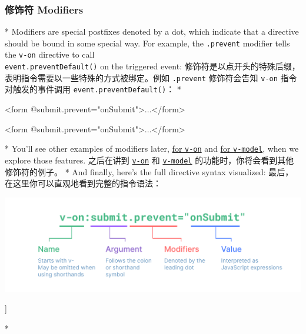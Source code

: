 \begin{paracol}{2}
\subsubsection{修饰符 Modifiers}
\switchcolumn[0]*%
Modifiers are special postfixes denoted by a dot, which indicate that a
directive should be bound in some special way. For example, the
\texttt{.prevent} modifier tells the \texttt{v-on} directive to call
\\\texttt{event.preventDefault()} on the triggered event:
\switchcolumn
修饰符是以点开头的特殊后缀，表明指令需要以一些特殊的方式被绑定。例如
\texttt{.prevent} 修饰符会告知 \texttt{v-on} 指令对触发的事件调用
\texttt{event.preventDefault()}：
\switchcolumn[0]*%
\begin{codeHtml}
<form @submit.prevent="onSubmit">...</form>
\end{codeHtml}  
\switchcolumn
\begin{codeHtml}
<form @submit.prevent="onSubmit">...</form>
\end{codeHtml}  
\switchcolumn[0]*%
You'll see other examples of modifiers later,
\href{https://vuejs.org/guide/essentials/event-handling.html\#event-modifiers}{for
\texttt{v-on}} and
\href{https://vuejs.org/guide/essentials/forms.html\#modifiers}{for
\texttt{v-model}}, when we explore those features.
\switchcolumn
之后在讲到
\href{https://cn.vuejs.org/guide/essentials/event-handling.html\#event-modifiers}{\texttt{v-on}}
和
\href{https://cn.vuejs.org/guide/essentials/forms.html\#modifiers}{\texttt{v-model}}
的功能时，你将会看到其他修饰符的例子。
\switchcolumn[0]*%
And finally, here's the full directive syntax visualized:
\switchcolumn
最后，在这里你可以直观地看到完整的指令语法：
\end{paracol}
\begin{center} 
\includegraphics{./img/directive.69c37117.png} 
\end{center}


]%
\begin{vueQuote}
\end{vueQuote} 


\switchcolumn[0]*%
\begin{codeHtml}

\end{codeHtml}  
\switchcolumn
\begin{codeHtml}

\end{codeHtml}  